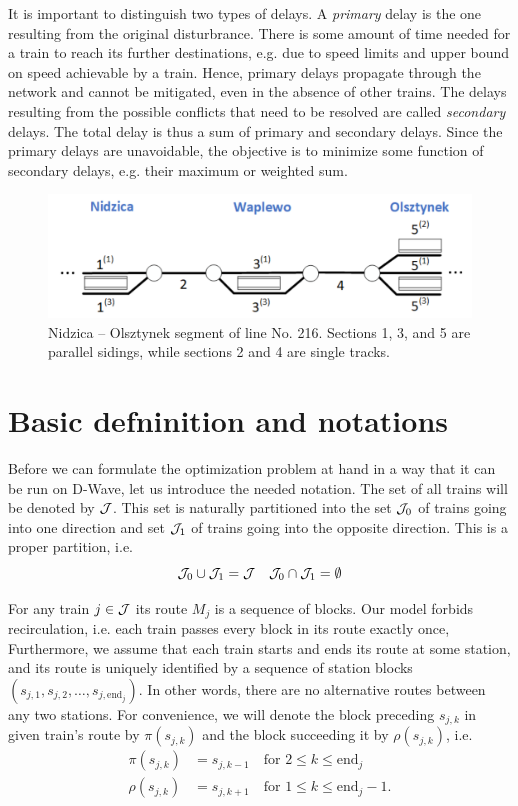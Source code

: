 It is important to distinguish two types of delays. A \emph{primary} delay is the one resulting
from the original disturbrance. There is some amount of time needed for a train to reach its
further destinations, e.g. due to speed limits and upper bound on speed achievable by a train.
Hence, primary delays propagate through the network and cannot be mitigated, even in the absence
of other trains. The delays resulting from the possible conflicts that need to be resolved are
called \emph{secondary} delays. The total delay is thus a sum of primary and secondary delays.
Since the primary delays are unavoidable, the objective is to minimize some function of secondary
delays, e.g. their maximum or weighted sum.

\begin{figure}
    \label{fig:railway-network}
    \includegraphics[width=\textwidth]{figures/line_small.pdf}
    \caption{
        Nidzica -- Olsztynek segment of line No. 216. Sections 1, 3, and 5 are parallel sidings,
        while sections 2 and 4 are single tracks.
    }
\end{figure}

\section{Basic defninition and notations}
Before we can formulate the optimization problem at hand in a way that it can be run on D-Wave,
let us introduce the needed notation. The set of all trains will be denoted by $\mathcal{J}$. This set is
naturally partitioned into the set $\mathcal{J}_0$ of trains going into one direction and set $\mathcal{J}_1$ of
trains going into the opposite direction. This is a proper partition, i.e.
\begin{equation}
    \mathcal{J}_0 \cup \mathcal{J}_1 = \mathcal{J} \quad \mathcal{J}_0 \cap \mathcal{J}_1 = \emptyset
\end{equation}

For any train $j \in \mathcal{J}$ its route $M_j$ is a sequence of blocks. Our model forbids recirculation,
 i.e. each train passes every block in its route exactly once, Furthermore, we assume that each
 train starts and ends its route at some station, and its route is uniquely identified by a
 sequence of station blocks
 $\left(s_{j,1}, s_{j, 2}, \ldots, s_{j, \mbox{end}_j}\right)$. In other words, there are no
 alternative routes between any two stations. For convenience, we will denote the block preceding
 $s_{j,k}$ in given train's route by $\pi(s_{j,k})$ and the block succeeding it by $\rho(s_{j,k})$,
 i.e.
 \begin{align}
     \pi(s_{j,k}) &= s_{j,k-1} \quad \mbox{for } 2 \le k \le \mbox{end}_j \\
     \rho(s_{j,k}) &= s_{j,k+1} \quad \mbox{for } 1 \le k \le \mbox{end}_j - 1.
 \end{align}

